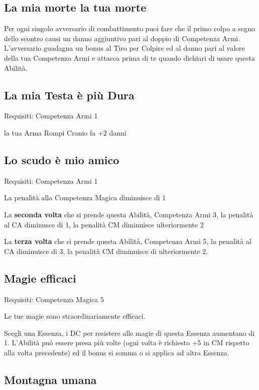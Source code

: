 \documentclass[a4paper,11pt,twoside,openany]{book}
\begin{document}
\subsection{La mia morte la tua morte}

Per ogni singolo avversario di combattimento puoi fare che il primo colpo a segno dello scontro causi un danno aggiuntivo pari al doppio di Competenza Armi. L'avversario guadagna un bonus al Tiro per Colpire ed al danno pari al valore della tua Competenza Armi e attacca prima di te quando dichiari di usare questa Abilità.

\subsection{La mia Testa è più Dura}

Requisiti: Competenza Armi 1

la tua Arma Rompi Cranio fa +2 danni

\subsection{Lo scudo è mio amico}

Requisiti: Competenza Armi 1

La penalità alla Competenza Magica diminuisce di 1

La \textbf{seconda volta} che si prende questa Abilità, Competenza Armi 3, la penalità al CA diminusce di 1, la penalità CM diminuisce ulteriormente 2

La \textbf{terza volta} che si prende questa Abilità, Competenza Armi 5, la penalità al CA diminuisce di 3, la penalità CM diminuisce di ulteriormente 2.

\subsection{Magie efficaci}

Requisiti: Competenza Magica 5

Le tue magie sono straordinariamente efficaci.

Scegli una Essenza, i DC per resistere alle magie di questa Essenza aumentano di 1. L'Abilità può essere presa più volte (ogni volta è richiesto +5 in CM rispetto alla volta precedente) ed il bonus si somma o si applica ad altra Essenza.

\subsection{Montagna umana}
\end{document}
